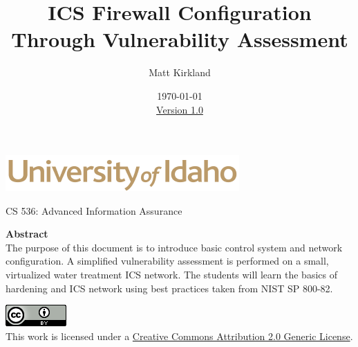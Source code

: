 \documentclass[12pt]{extarticle}
\begin{document}
\title{ICS Firewall Configuration Through Vulnerability Assessment}
\author{Matt Kirkland}
\date{\today \\ \hyperref[changelog]{Version 1.0}} %
\renewcommand{\abstractname}{Summary}
\begin{titlepage}
\maketitle
{}
\begin{center}
\includegraphics[scale=.5]{UofI}

\large{CS 536: Advanced Information Assurance}

\vskip 40pt

\textbf{Abstract}\\
The purpose of this document is to introduce basic control system and network configuration. A simplified vulnerability assessment is performed on a small, virtualized water treatment ICS network. The students will learn the basics of hardening and ICS network using best practices taken from NIST SP 800-82.
\end{center}


\vfill
\begin{center}
\includegraphics[scale=.5]{cc}\\
This work is licensed under a \href{https://creativecommons.org/licenses/by/2.0/}{Creative Commons Attribution 2.0 Generic License}.
\vskip 10pt
\end{center}

\end{titlepage}


\pagebreak
\tableofcontents


\pagebreak
{}
\setcounter{section}{1}



\end{document}
